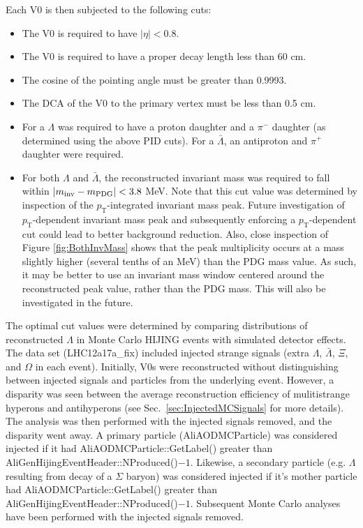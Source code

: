 Each V0 is then subjected to the following cuts:
\begin{itemize}
\item The V0 is required to have $|\eta| < 0.8$.
\item The V0 is required to have a proper decay length less than 60 cm.
\item The cosine of the pointing angle must be greater than 0.9993.
\item The DCA of the V0 to the primary vertex must be less than 0.5 cm.
\item For a $\Lambda$ was required to have a proton daughter and a $\pi^-$ daughter (as determined using the above PID cuts).  
For a $\bar{\Lambda}$, an antiproton and $\pi^+$ daughter were required.
\item For both $\Lambda$ and $\bar{\Lambda}$, the reconstructed invariant mass was required to fall within $\left\lvert m_\mathrm{inv}-m_\mathrm{PDG}\right\rvert < 3.8$ MeV.  
Note that this cut value was determined by inspection of the $p_\mathrm{T}$-integrated invariant mass peak.  
Future investigation of $p_\mathrm{T}$-dependent invariant mass peak and subsequently enforcing a $p_\mathrm{T}$-dependent cut could lead to better background reduction.  
Also, close inspection of Figure \ref{fig:BothInvMass} shows that the peak multiplicity occurs at a mass slightly higher (several tenths of an MeV) than the PDG mass value.  
As such, it may be better to use an invariant mass window centered around the reconstructed peak value, rather than the PDG mass.  
This will also be investigated in the future.
\end{itemize}

The optimal cut values were determined by comparing distributions of reconstructed $\Lambda$ in Monte Carlo HIJING events with simulated detector effects.  
The data set (LHC12a17a\_fix) included injected strange signals (extra $\Lambda$, $\bar{\Lambda}$, $\Xi$, and $\Omega$ in each event).  
Initially, V0s were reconstructed without distinguishing between injected signals and particles from the underlying event.  
However, a disparity was seen between the average reconstruction efficiency of mulitistrange hyperons and antihyperons (see Sec.\ \ref{sec:InjectedMCSignals} for more details).  
The analysis was then performed with the injected signals removed, and the disparity went away.  A primary particle (AliAODMCParticle) was considered injected if it had AliAODMCParticle::GetLabel() greater than AliGenHijingEventHeader::NProduced()$-1$. 
Likewise, a secondary particle (e.g. $\Lambda$ resulting from decay of a $\Sigma$ baryon) was considered injected if it's mother particle had AliAODMCParticle::GetLabel() greater than AliGenHijingEventHeader::NProduced()$-1$.  
Subsequent Monte Carlo analyses have been performed with the injected signals removed.

